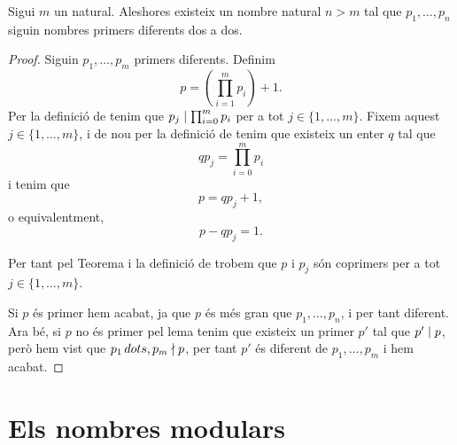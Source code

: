 \documentclass[../Apunts.tex]{subfiles}
\begin{document}
	\begin{theorem}
		\label{thm:Teorema d'Euclides}
		Sigui \(m\) un natural. Aleshores existeix un nombre natural \(n>m\) tal que \(p_{1},\dots,p_{n}\) siguin nombres primers diferents dos a dos.
		\begin{proof}
			Siguin \(p_{1},\dots,p_{m}\) primers diferents. Definim
			\[p=\left(\prod_{i=1}^{m}p_{i}\right)+1.\]
			Per la definició de  tenim que \(p_{j}\mathrel{|}\prod_{i=0}^{m}p_{i}\) per a tot \(j\in\{1,\dots,m\}\). Fixem aquest \(j\in\{1,\dots,m\}\), i de nou per la definició de  tenim que existeix un enter \(q\) tal que
			\[qp_{j}=\prod_{i=0}^{m}p_{i}\]
			i tenim que
			\[p=qp_{j}+1,\]
			o equivalentment,
			\[p-qp_{j}=1.\]
			
			Per tant pel Teorema  i la definició de  trobem que \(p\) i \(p_{j}\) són coprimers per a tot \(j\in\{1,\dots,m\}\).
			
			Si \(p\) és primer hem acabat, ja que \(p\) és més gran que \(p_{1},\dots,p_{n}\), i per tant diferent. Ara bé, si \(p\) no és primer pel lema  tenim que existeix un primer \(p'\) tal que \(p'\mathrel{|} p\), però hem vist que \(p_{1}\,dots,p_{m}\mathrel{\nmid} p\), per tant \(p'\) és diferent de \(p_{1},\dots,p_{m}\) i hem acabat.
		\end{proof}
	\end{theorem}
	\section{Els nombres modulars}
\end{document}
